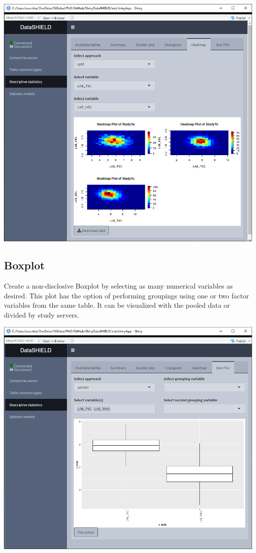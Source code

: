 \documentclass[
]{book}
\begin{document}
\includegraphics{images/descriptive_stats5_2.png}

\hypertarget{boxplot}{%
\subsection{Boxplot}\label{boxplot}}

Create a non-disclosive Boxplot by selecting as many numerical variables as desired. This plot has the option of performing groupings using one or two factor variables from the same table. It can be visualized with the pooled data or divided by study servers.

\includegraphics{images/descriptive_stats6.png}
\end{document}
